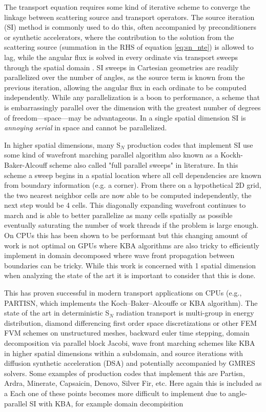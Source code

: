 The transport equation requires some kind of iterative scheme to converge the linkage between scattering source and transport operators.
The source iteration (SI) method is commonly used to do this, often accompanied by preconditioners or synthetic accelerators, where the contribution to the solution from the scattering source (summation in the RHS of equation \ref{eq:sn_nte}) is allowed to lag, while the angular flux is solved in every ordinate via transport sweeps through the spatial domain \cite{adams_subcell_1997}.
SI sweeps in Cartesian geometries are readily parallelized over the number of angles, as the source term is known from the previous iteration, allowing the angular flux in each ordinate to be computed independently. 
While any parallelization is a boon to performance, a scheme that is embarrassingly parallel over the dimension with the greatest number of degrees of freedom---space---may be advantageous.
In a single spatial dimension SI is \textit{annoying serial} in space and cannot be parallelized.

In higher spatial dimensions, many S$_N$ production codes that implement SI use some kind of wavefront marching parallel algorithm also known as a Kockh-Baker-Alcouff scheme \citep{KBA} also called "full parallel sweeps" in literature.
In this scheme a sweep begins in a spatial location where all cell dependencies are known from boundary information (e.g. a corner).
From there on a hypothetical 2D grid, the two nearest neighbor cells are now able to be computed independently, the next step would be 4 cells.
This diagonally expanding wavefront continues to march and is able to better parallelize as many cells spatially as possible eventually saturating the number of work threads if the problem is large enough.
On CPUs this has been shown to be performant but this changing amount of work is not optimal on GPUs where 
KBA algorithms are also tricky to efficiently implement in domain decomposed where wave front propagation between boundaries can be tricky.
While this work is concerned with 1 spatial dimension when analyzing the state of the art it is important to consider that this is done.

This has proven successful in modern transport applications on CPUs 
(e.g., PARTISN, which implements the Koch--Baker--Alcouffe or KBA algorithm). 
The state of the art in deterministic S$_N$ radiation transport is multi-group in energy distribution, diamond differencing first order space discretizations or other FEM FVM schemes on unstructured meshes, backward euler time stepping, domain decomposition via parallel block Jacobi, wave front marching schemes like KBA in higher spatial dimensions within a subdomain, and source iterations with diffusion synthetic acceleration (DSA) and potentially accompanied by GMRES solvers. Some examples of production codes that implement this are Partisn, Ardra, Minerate, Capsaicin, Denovo, Silver Fir, etc.
Here again this is included as a
Each one of these points becomes more difficult to implement due to angle-parallel SI with KBA, for example domain decompisition 

